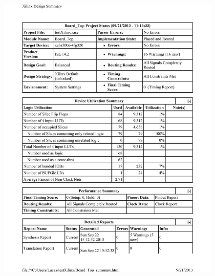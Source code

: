\documentclass{article}
\begin{document}
\begin{figure}[h!]
  \centering
	\includegraphics[scale=0.7]{Board_Top_summary-1.png}\\[1cm] 
\end{figure}
\end{document}
